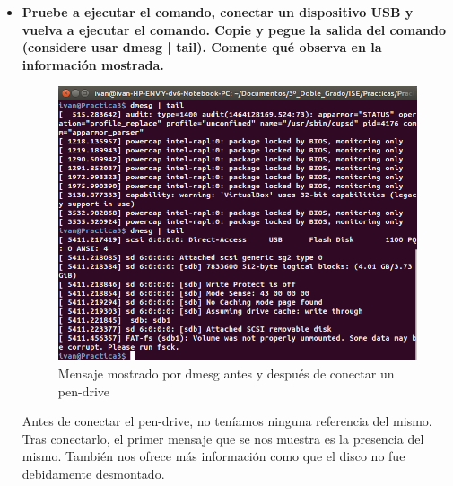 \begin{itemize}
	\item \textbf{Pruebe a ejecutar el comando, conectar un dispositivo USB y vuelva a
		ejecutar el comando. Copie y pegue la salida del comando (considere usar dmesg |
		tail). Comente qué observa en la información mostrada.}\\
	
	\begin{figure}[H]
	\centering
	\includegraphics[width=0.7\linewidth]{dmesgPenDrive}
	\caption[dmesg]{Mensaje mostrado por dmesg antes y después de conectar un pen-drive}
	\label{fig:dmesgPenDrive}
	\end{figure}
	
	Antes de conectar el pen-drive, no teníamos ninguna referencia del mismo. Tras conectarlo, el primer mensaje que se nos muestra es la presencia del mismo. También nos ofrece más información como que el disco no fue debidamente desmontado.

	
\end{itemize}
\newpage
